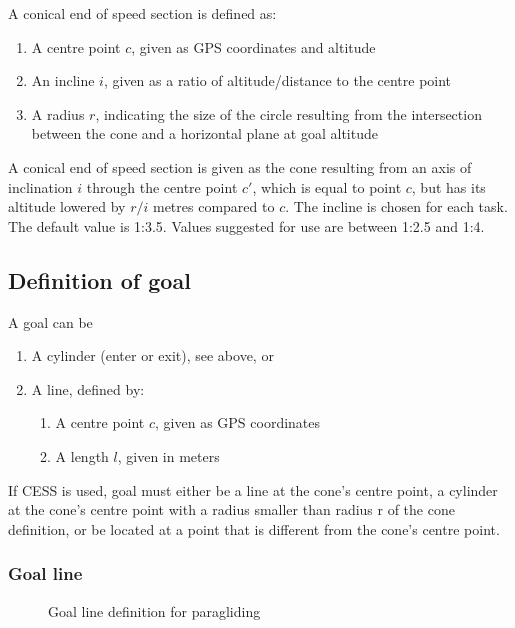 \documentclass{article}
\begin{document}
\begin{pg}
A conical end of speed section is defined as:
\begin{enumerate}
    \item A centre point \(c\), given as GPS coordinates and altitude
    \item
        An incline \(i\), given as a ratio of altitude/distance to the centre
        point
    \item
        A radius \(r\), indicating the size of the circle resulting from the
        intersection between the cone and a horizontal plane at goal altitude
\end{enumerate}

A conical end of speed section is given as the cone resulting from an axis of
inclination \(i\) through the centre point \(c'\), which is equal to point
\(c\), but has its altitude lowered by \(r/i\) metres compared to \(c\).  The
incline is chosen for each task. The default value is 1:3.5. Values suggested
for use are between
1:2.5 and 1:4.
\end{pg}
\subsection{Definition of goal}
\label{sec:goal-definition}
A goal can be
\begin{enumerate}
    \item A cylinder (enter or exit), see above, or
    \item A line, defined by:
    \begin{enumerate}
        \item A centre point \(c\), given as GPS coordinates
        \item A length \(l\), given in meters
    \end{enumerate}
\end{enumerate}

\begin{pg}
If CESS is used, goal must either be a line at the cone’s centre point,
a cylinder at the cone’s centre point with a radius smaller than radius r of
the cone definition, or be located at a point that is different from the cone’s
centre point.
\end{pg}

\subsubsection{Goal line}
\label{sec:goal-line}
\begin{figure}[h]
    \centering
    
    \caption{Goal line definition for paragliding}
\end{figure}
\end{document}

